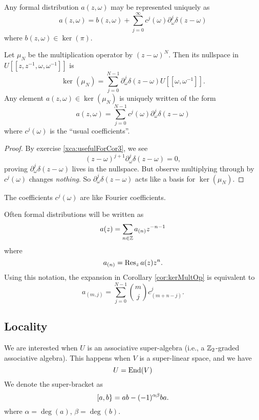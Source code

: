 \begin{cor}
Any formal distribution $a(z,\omega)$ may be represented uniquely as
\begin{equation}
a(z,\omega)=b(z,\omega) + \sum^{\infty}_{j=0}c^{j}(\omega)\partial^{j}_{\omega}\delta(z-\omega)
\end{equation}
where $b(z,\omega)\in\ker(\pi)$.
\end{cor}
\begin{cor}\label{cor:kerMultOp}
Let $\mu_{N}$ be the multiplication operator by $(z-\omega)^{N}$. Then
its nullspace in $U[[z,z^{-1},\omega,\omega^{-1}]]$ is
\begin{equation}
\ker(\mu_{N})=\sum^{N-1}_{j=0}\partial^{j}_{\omega}\delta(z-\omega)U[[\omega,\omega^{-1}]].
\end{equation}
Any element $a(z,\omega)\in\ker(\mu_N)$ is uniquely written of the form
\begin{equation}
a(z,\omega)=\sum^{N-1}_{j=0}c^{j}(\omega)\partial^{j}_{\omega}\delta(z-\omega)
\end{equation}
where $c^{j}(\omega)$ is the ``usual coefficients''.
\end{cor}
\begin{proof}
By exercise \ref{xca:usefulForCor3}, we see
\begin{equation}
(z-\omega)^{j+1}\partial_{\omega}^{j}\delta(z-\omega)=0,
\end{equation}
proving $\partial_{\omega}^{j}\delta(z-\omega)$ lives in the
nullspace. But observe multiplying through by $c^{j}(\omega)$ changes
\emph{nothing}. So $\partial_{\omega}^{j}\delta(z-\omega)$ acts like a
basis for $\ker(\mu_N)$.
\end{proof}
\begin{rmk}
The coefficients $c^{j}(\omega)$ are like Fourier coefficients.
\end{rmk}
Often formal distributions will be written as 
\begin{equation}
a(z)=\sum_{n\in\ZZ}a_{(n)}z^{-n-1}
\end{equation}
where
\begin{equation}
a_{(n)}=\Res[z]{a(z)z^{n}}.
\end{equation}
Using this notation, the expansion in Corollary \ref{cor:kerMultOp} is
equivalent to 
\begin{equation}
a_{(m,j)}=\sum^{N-1}_{j=0}{m\choose j}c^{j}_{(m+n-j)}.
\end{equation}

\subsection{Locality}
\M
We are interested when $U$ is an associative super-algebra (i.e., a
$\ZZ_2$-graded associative algebra). This happens when $V$ is a
super-linear space, and we have
\begin{equation}
U=\End(V)
\end{equation}
We denote the super-bracket as
\begin{equation}
\superb{a}{b}=ab-(-1)^{\alpha\beta}ba.
\end{equation}
where $\alpha=\deg(a)$, $\beta=\deg(b)$.

